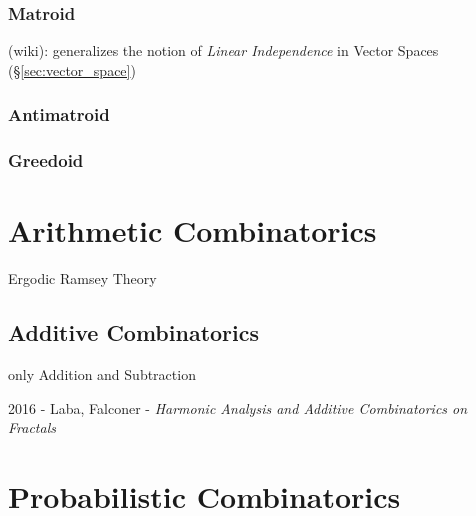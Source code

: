 \subsubsection{Matroid}\label{sec:matroid}

(wiki): generalizes the notion of \emph{Linear Independence} in Vector Spaces
(\S\ref{sec:vector_space})



\subsubsection{Antimatroid}\label{sec:antimatroid}

\subsubsection{Greedoid}\label{sec:greedoid}



\section{Arithmetic Combinatorics}\label{sec:arithmetic_combinatorics}

Ergodic Ramsey Theory



\subsection{Additive Combinatorics}\label{sec:additive_combinatorics}

only Addition and Subtraction

2016 - Laba, Falconer - \emph{Harmonic Analysis and Additive Combinatorics on
  Fractals}



\section{Probabilistic Combinatorics}\label{sec:probabilistic_combinatorics}

